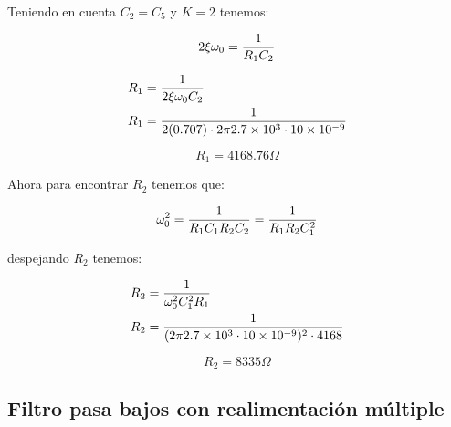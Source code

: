 Teniendo en cuenta $C_2 = C_5$ y $K=2$ tenemos:

\begin{equation}
    2\xi \omega_0 = \frac{1}{R_1 C_2}
\end{equation}

\begin{align*}
    R_1 &= \frac{1}{2\xi \omega_0 C_2} \\
    R_1 &= \frac{1}{2 (0.707) \cdot 2\pi 2.7\times 10^3 \cdot 10\times 10 ^{-9}}
\end{align*}

\begin{equation*}
    R_1 = 4168.76 \Omega
\end{equation*}

Ahora para encontrar $R_2$ tenemos que:

\begin{equation}
    \omega_0^2 = \frac{1}{R_1 C_1 R_2 C_2} = \frac{1}{R_1 R_2 C_1^2}
\end{equation}

despejando $R_2$ tenemos:

\begin{align*}
    R_2 &= \frac{1}{\omega_0^2 C_1^2 R_1} \\
    R_2 &= \frac{1}{(2\pi 2.7\times 10^3 \cdot 10\times 10^{-9})^2 \cdot 4168} \\
\end{align*}

\begin{equation*}
    \boxed{R_2 = 8335 \Omega}
\end{equation*}

\subsection{Filtro pasa bajos con realimentación múltiple}